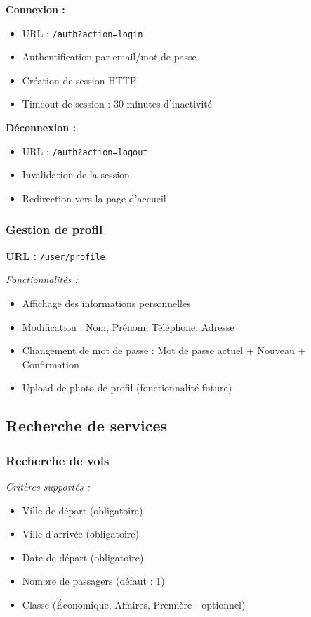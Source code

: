 \documentclass[12pt,a4paper]{report}
\begin{document}
\textbf{Connexion :}
\begin{itemize}
    \item URL : \texttt{/auth?action=login}
    \item Authentification par email/mot de passe
    \item Création de session HTTP
    \item Timeout de session : 30 minutes d'inactivité
\end{itemize}

\textbf{Déconnexion :}
\begin{itemize}
    \item URL : \texttt{/auth?action=logout}
    \item Invalidation de la session
    \item Redirection vers la page d'accueil
\end{itemize}

\subsubsection{Gestion de profil}

\textbf{URL :} \texttt{/user/profile}

\textit{Fonctionnalités :}
\begin{itemize}
    \item Affichage des informations personnelles
    \item Modification : Nom, Prénom, Téléphone, Adresse
    \item Changement de mot de passe : Mot de passe actuel + Nouveau + Confirmation
    \item Upload de photo de profil (fonctionnalité future)
\end{itemize}

\subsection{Recherche de services}

\subsubsection{Recherche de vols}

\textit{Critères supportés :}
\begin{itemize}
    \item Ville de départ (obligatoire)
    \item Ville d'arrivée (obligatoire)
    \item Date de départ (obligatoire)
    \item Nombre de passagers (défaut : 1)
    \item Classe (Économique, Affaires, Première - optionnel)
\end{itemize}
\end{document}
